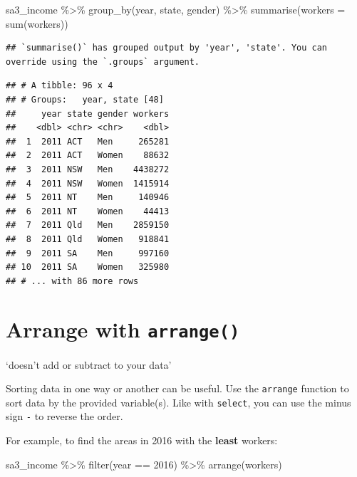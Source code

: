 \documentclass[
]{book}
\newenvironment{Shaded}{\begin{snugshade}}{\end{snugshade}}
\newcommand{\AttributeTok}[1]{\textcolor[rgb]{0.77,0.63,0.00}{#1}}
\newcommand{\DecValTok}[1]{\textcolor[rgb]{0.00,0.00,0.81}{#1}}
\newcommand{\FunctionTok}[1]{\textcolor[rgb]{0.00,0.00,0.00}{#1}}
\newcommand{\NormalTok}[1]{#1}
\newcommand{\SpecialCharTok}[1]{\textcolor[rgb]{0.00,0.00,0.00}{#1}}
\begin{document}
\begin{Shaded}
\begin{Highlighting}[]
\NormalTok{sa3\_income }\SpecialCharTok{\%\textgreater{}\%} 
  \FunctionTok{group\_by}\NormalTok{(year, state, gender) }\SpecialCharTok{\%\textgreater{}\%} 
  \FunctionTok{summarise}\NormalTok{(}\AttributeTok{workers =} \FunctionTok{sum}\NormalTok{(workers))}
\end{Highlighting}
\end{Shaded}

\begin{verbatim}
## `summarise()` has grouped output by 'year', 'state'. You can override using the `.groups` argument.
\end{verbatim}

\begin{verbatim}
## # A tibble: 96 x 4
## # Groups:   year, state [48]
##     year state gender workers
##    <dbl> <chr> <chr>    <dbl>
##  1  2011 ACT   Men     265281
##  2  2011 ACT   Women    88632
##  3  2011 NSW   Men    4438272
##  4  2011 NSW   Women  1415914
##  5  2011 NT    Men     140946
##  6  2011 NT    Women    44413
##  7  2011 Qld   Men    2859150
##  8  2011 Qld   Women   918841
##  9  2011 SA    Men     997160
## 10  2011 SA    Women   325980
## # ... with 86 more rows
\end{verbatim}

\hypertarget{arrange-with-arrange}{%
\section{\texorpdfstring{Arrange with \texttt{arrange()}}{Arrange with arrange()}}\label{arrange-with-arrange}}

`doesn't add or subtract to your data'

Sorting data in one way or another can be useful. Use the \texttt{arrange} function to sort data by the provided variable(s). Like with \texttt{select}, you can use the minus sign \texttt{-} to reverse the order.

For example, to find the areas in 2016 with the \textbf{least} workers:

\begin{Shaded}
\begin{Highlighting}[]
\NormalTok{sa3\_income }\SpecialCharTok{\%\textgreater{}\%}
  \FunctionTok{filter}\NormalTok{(year }\SpecialCharTok{==} \DecValTok{2016}\NormalTok{) }\SpecialCharTok{\%\textgreater{}\%} 
  \FunctionTok{arrange}\NormalTok{(workers)}
\end{Highlighting}
\end{Shaded}
\end{document}
